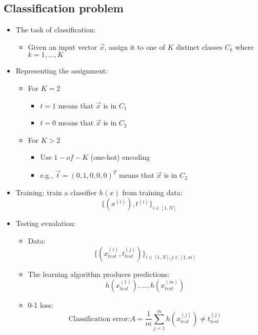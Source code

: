\subsection{Classification problem}
\begin{itemize}
	\item The task of classification:
	\begin{itemize}
		\item Given an input vector $\vec{x}$, assign it to one of $K$ distinct classes $C_k$ where $k=1,\ldots, K$
	\end{itemize}
	\item Representing the assignment:
	\begin{itemize}
		\item For $K=2$
		\begin{itemize}
			\item $t=1$ means that $\vec{x}$ is in $C_1$
			\item $t=0$ means that $\vec{x}$ is in $C_2$
		\end{itemize}
		\item For $K>2$
		\begin{itemize}
			\item Use $1-of-K$ (one-hot) encoding
			\item e.g., $\vec{t}=(0, 1, 0, 0, 0)^T$ means that $\vec{x}$ is in $C_2$
		\end{itemize}
	\end{itemize}
	\item Training: train a classifier $h(x)$ from training data:
		$$\{(x^{(i)}), t^{(i)}\}_{i\in[1, N]}$$
	\item Testing evualation:
	\begin{itemize}
		\item Data:
			$$\{ (x^{(i)}_{test}, t^{(j)}_{test})\}_{i\in[1, N], j\in[1, m]}$$
		\item The learning algorithm produces predictions: 
			$$h(x^{(1)}_{test}), \ldots, h(x^{(m)}_{test})$$
		\item 0-1 loss:
			$$\text{Classification error:} A=\frac{1}{m}\sum_{j=1}^m h(x^{(j)}_{test})\neq t^{(j)}_{test}$$
	\end{itemize}
\end{itemize}

